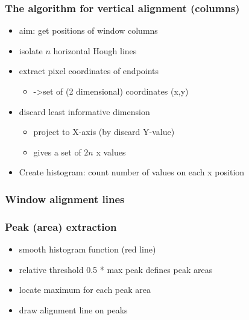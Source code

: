 \documentclass{beamer}
\begin{document}
\frame
{
	\frametitle{The algorithm for vertical alignment (columns)}
	\begin{itemize}
	\item <+-| alert@+> aim: get positions of window columns
	\item <+-| alert@+> isolate $n$ horizontal Hough lines
	\item <+-| alert@+> extract pixel coordinates of endpoints 
		\begin{itemize}
		\item <+-| alert@+> ->set of (2 dimensional) coordinates (x,y)
		\end{itemize}
	\item <+-| alert@+> discard least informative dimension
		\begin{itemize}
		\item <+-| alert@+> project to X-axis (by discard Y-value) 
		\item <+-| alert@+> gives a set of $2n$ x values 
		\end{itemize}
	\item <+-| alert@+> Create histogram: count number of values on each x position
	\end{itemize}
}

\frame
{
	\frametitle{Window alignment lines}
}
\frame
{
	\frametitle{Peak (area) extraction}
	\begin{itemize}
	\item <+-| alert@+> smooth histogram function (red line) 
	\item <+-| alert@+> relative threshold 0.5 * max peak defines peak areas
	\item <+-| alert@+> locate maximum for each peak area
	\item <+-| alert@+> draw alignment line on peaks
	\end{itemize}
}
\end{document}

